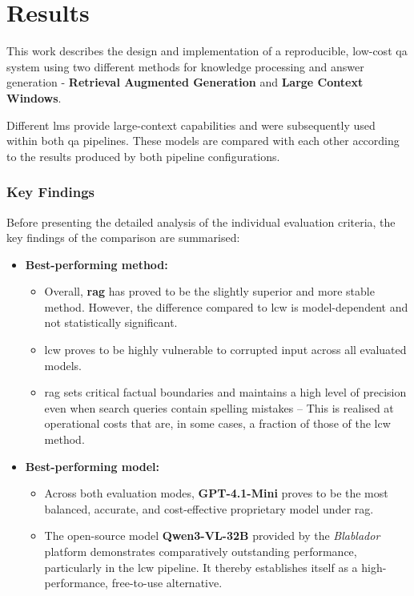 \chapter{Results}\label{ch:results}
This work describes the design and implementation of a reproducible, low-cost \ac{qa} system using two different methods for knowledge processing and answer generation - \textbf{Retrieval Augmented Generation} and \textbf{Large Context Windows}.

Different \acp{lm} provide large-context capabilities and were subsequently used within both \ac{qa} pipelines.
These models are compared with each other according to the results produced by both pipeline configurations.

\subsection*{Key Findings}\label{res:key_findings}

   Before presenting the detailed analysis of the individual evaluation criteria, the key findings of the comparison are summarised:
\begin{itemize}
    \item \textbf{Best-performing method:} 
    \begin{itemize}
        \item Overall, \textbf{\ac{rag}} has proved to be the slightly superior and more stable method.
        However, the difference compared to \ac{lcw} is model-dependent and not statistically significant.
        \item \ac{lcw} proves to be highly vulnerable to corrupted input across all evaluated models.
        \item \ac{rag} sets critical factual boundaries and maintains a high level of precision even when search queries contain spelling mistakes – This is realised at operational costs that are, in some cases, a fraction of those of the \ac{lcw} method.
    \end{itemize}
    \item \textbf{Best-performing model:}
        \begin{itemize}
            \item Across both evaluation modes, \textbf{GPT-4.1-Mini} proves to be the most balanced, accurate, and cost-effective proprietary model under \ac{rag}.
            \item The open-source model \textbf{Qwen3-VL-32B} provided by the \textit{Blablador} platform demonstrates comparatively outstanding performance, particularly in the \ac{lcw} pipeline.
            It thereby establishes itself as a high-performance, free-to-use alternative.
        \end{itemize}
    \end{itemize}

